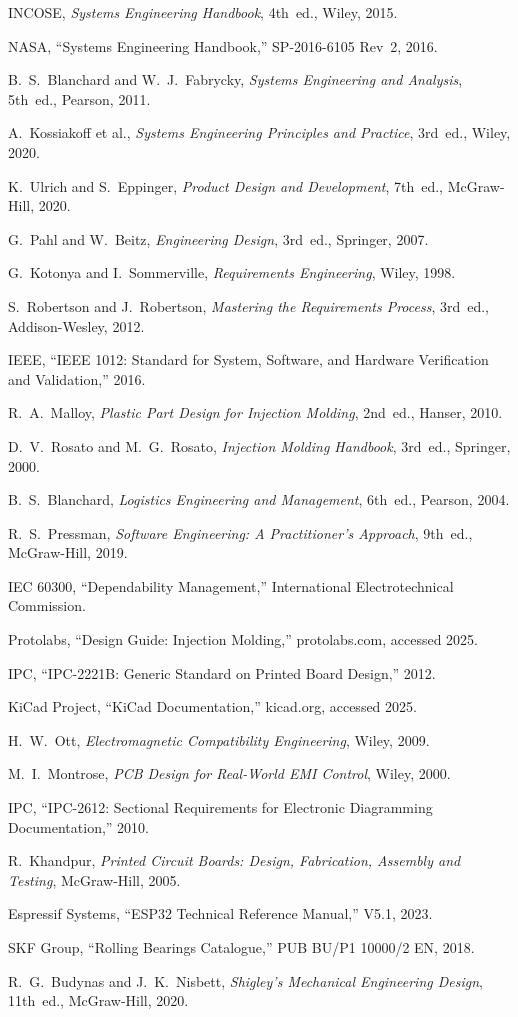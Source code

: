 \documentclass[11pt,letterpaper,twoside,openany]{book}
\begin{document}
\begin{enumerate}[label={[\arabic*]},leftmargin=2em]
\item INCOSE, \emph{Systems Engineering Handbook}, 4th~ed., Wiley, 2015.
\item NASA, ``Systems Engineering Handbook,'' SP-2016-6105 Rev~2, 2016.
\item B.~S.~Blanchard and W.~J.~Fabrycky, \emph{Systems Engineering and Analysis}, 5th~ed., Pearson, 2011.
\item A.~Kossiakoff et al., \emph{Systems Engineering Principles and Practice}, 3rd~ed., Wiley, 2020.
\item K.~Ulrich and S.~Eppinger, \emph{Product Design and Development}, 7th~ed., McGraw-Hill, 2020.
\item G.~Pahl and W.~Beitz, \emph{Engineering Design}, 3rd~ed., Springer, 2007.
\item G.~Kotonya and I.~Sommerville, \emph{Requirements Engineering}, Wiley, 1998.
\item S.~Robertson and J.~Robertson, \emph{Mastering the Requirements Process}, 3rd~ed., Addison-Wesley, 2012.
\item IEEE, ``IEEE 1012: Standard for System, Software, and Hardware Verification and Validation,'' 2016.
\item R.~A.~Malloy, \emph{Plastic Part Design for Injection Molding}, 2nd~ed., Hanser, 2010.
\item D.~V.~Rosato and M.~G.~Rosato, \emph{Injection Molding Handbook}, 3rd~ed., Springer, 2000.
\item B.~S.~Blanchard, \emph{Logistics Engineering and Management}, 6th~ed., Pearson, 2004.
\item R.~S.~Pressman, \emph{Software Engineering: A Practitioner's Approach}, 9th~ed., McGraw-Hill, 2019.
\item IEC 60300, ``Dependability Management,'' International Electrotechnical Commission.
\item Protolabs, ``Design Guide: Injection Molding,'' protolabs.com, accessed 2025.
\item IPC, ``IPC-2221B: Generic Standard on Printed Board Design,'' 2012.
\item KiCad Project, ``KiCad Documentation,'' kicad.org, accessed 2025.
\item H.~W.~Ott, \emph{Electromagnetic Compatibility Engineering}, Wiley, 2009.
\item M.~I.~Montrose, \emph{PCB Design for Real-World EMI Control}, Wiley, 2000.
\item IPC, ``IPC-2612: Sectional Requirements for Electronic Diagramming Documentation,'' 2010. \label{ipc2612}
\item R.~Khandpur, \emph{Printed Circuit Boards: Design, Fabrication, Assembly and Testing}, McGraw-Hill, 2005.
\item Espressif Systems, ``ESP32 Technical Reference Manual,'' V5.1, 2023.
\item SKF Group, ``Rolling Bearings Catalogue,'' PUB BU/P1 10000/2 EN, 2018.
\item R.~G.~Budynas and J.~K.~Nisbett, \emph{Shigley's Mechanical Engineering Design}, 11th~ed., McGraw-Hill, 2020.
\end{enumerate}

\printindex
\end{document}
